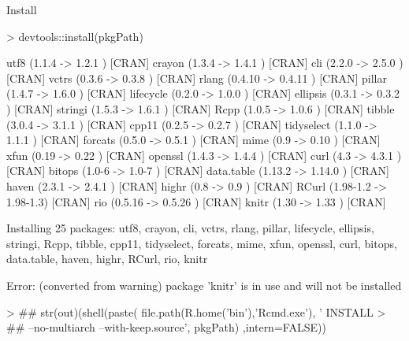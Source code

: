 \documentclass[a4paper,12pt]{article}\usepackage[]{graphicx}\usepackage[]{color}
\begin{document}
Install

\begin{Schunk}
\begin{Sinput}
> devtools::install(pkgPath)
\end{Sinput}
\begin{Soutput}
utf8       (1.1.4    -> 1.2.1   ) [CRAN]
crayon     (1.3.4    -> 1.4.1   ) [CRAN]
cli        (2.2.0    -> 2.5.0   ) [CRAN]
vctrs      (0.3.6    -> 0.3.8   ) [CRAN]
rlang      (0.4.10   -> 0.4.11  ) [CRAN]
pillar     (1.4.7    -> 1.6.0   ) [CRAN]
lifecycle  (0.2.0    -> 1.0.0   ) [CRAN]
ellipsis   (0.3.1    -> 0.3.2   ) [CRAN]
stringi    (1.5.3    -> 1.6.1   ) [CRAN]
Rcpp       (1.0.5    -> 1.0.6   ) [CRAN]
tibble     (3.0.4    -> 3.1.1   ) [CRAN]
cpp11      (0.2.5    -> 0.2.7   ) [CRAN]
tidyselect (1.1.0    -> 1.1.1   ) [CRAN]
forcats    (0.5.0    -> 0.5.1   ) [CRAN]
mime       (0.9      -> 0.10    ) [CRAN]
xfun       (0.19     -> 0.22    ) [CRAN]
openssl    (1.4.3    -> 1.4.4   ) [CRAN]
curl       (4.3      -> 4.3.1   ) [CRAN]
bitops     (1.0-6    -> 1.0-7   ) [CRAN]
data.table (1.13.2   -> 1.14.0  ) [CRAN]
haven      (2.3.1    -> 2.4.1   ) [CRAN]
highr      (0.8      -> 0.9     ) [CRAN]
RCurl      (1.98-1.2 -> 1.98-1.3) [CRAN]
rio        (0.5.16   -> 0.5.26  ) [CRAN]
knitr      (1.30     -> 1.33    ) [CRAN]
\end{Soutput}
\begin{Soutput}
Installing 25 packages: utf8, crayon, cli, vctrs, rlang, pillar, lifecycle, ellipsis, stringi, Rcpp, tibble, cpp11, tidyselect, forcats, mime, xfun, openssl, curl, bitops, data.table, haven, highr, RCurl, rio, knitr
\end{Soutput}
\begin{Soutput}
Error: (converted from warning) package 'knitr' is in use and will not be installed
\end{Soutput}
\begin{Sinput}
> ## str(out)(shell(paste( file.path(R.home('bin'),'Rcmd.exe'), ' INSTALL
> ## --no-multiarch --with-keep.source', pkgPath) ,intern=FALSE))
\end{Sinput}
\end{Schunk}
\end{document}
